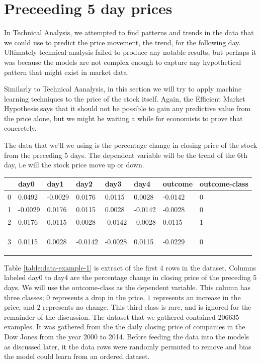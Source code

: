\documentclass{report}
\begin{document}
\clearpage
\section{Preceeding 5 day prices}

In Technical Analysis, we attempted to find patterns and trends in the data that we could use to predict the price movement, the trend, for the following day. Ultimately technical analysis failed to produce any notable results, but perhaps it was because the models are not complex enough to capture any hypothetical pattern that might exist in market data.

Similarly to Technical Aanalysis, in this section we will try to apply machine learning techniques to the price of the stock itself. Again, the Efficient Market Hypothesis says that it should not be possible to gain any predictive value from the price alone, but we might be waiting a while for economists to prove that concretely.

The data that we'll we using is the percentage change in closing price of the stock from the preceding 5 days. The dependent variable will be the trend of the 6th day, i.e will the stock price move up or down.

\begin{center}
    \begin{tabular}{l | l | l | l | l | l | l | l}
	& day0 & day1 &	day2 & day3 & day4 & outcome & outcome-class \\ \hline
0	& 0.0492 &	-0.0029 &	0.0176 &	0.0115 &	0.0028 &	-0.0142 &	0\\ \hline
1	& -0.0029 &	0.0176 &	0.0115 &	0.0028 & -0.0142 &	-0.0028 &	0\\ \hline
2	& 0.0176 &	0.0115 &	0.0028 &	-0.0142 & -0.0028 &	0.0115 &	1\\ \hline
3	& 0.0115 &	0.0028 &	-0.0142 &	-0.0028 &	0.0115 &	-0.0229 &	0

    \label{table:data-example-1}
    \end{tabular}
\end{center}

Table \ref{table:data-example-1} is extract of the first 4 rows in the dataset. Columns labeled day0 to day4 are the percentage change in closing price of the preceding 5 days. We will use the outcome-class as the dependent variable. This column has three classes; $0$ represents a drop in the price, $1$ represents an increase in the price, and $2$ represents no change. This third class is rare, and is ignored for the remainder of the discussion. The dataset that we gathered contained 206635 examples. It was gathered from the the daily closing price of companies in the Dow Jones from the year 2000 to 2014. Before feeding the data into the models as discussed later, it the data rows were randomly permuted to remove and bias the model could learn from an ordered dataset.
\end{document}
